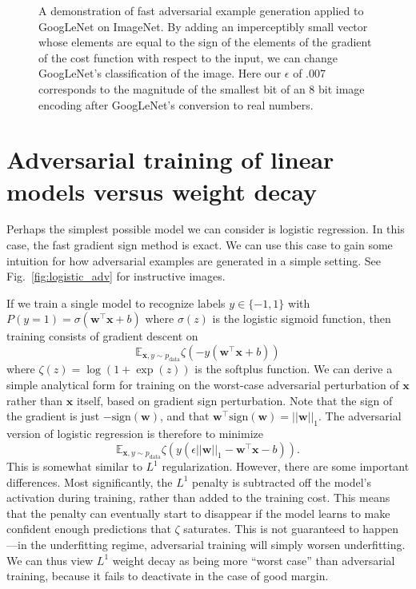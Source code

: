 \documentclass{article} %
\def\eps{{\epsilon}}
\def\sign{{\text{sign}}}
\def\vw{{\bm{w}}}
\def\vx{{\bm{x}}}
\begin{document}
\begin{figure}[t]
\begin{tabular}{>{\centering\arraybackslash}m{}m{.5in}>{\centering\arraybackslash}m{}m{.1in}>{\centering\arraybackslash}m{}}
\end{tabular}
    \caption[Fast adversarial sample generation]{
    A demonstration of fast adversarial example generation applied to GoogLeNet
    \citep{Szegedy-et-al-arxiv2014}
    on ImageNet.
    By adding an imperceptibly small vector whose elements are equal to the sign of the elements
    of the gradient of the cost function with respect to the input, we can
    change GoogLeNet's classification of the image. Here our $\eps$ of .007
    corresponds to the magnitude of the smallest bit of an 8 bit image encoding
    after GoogLeNet's conversion to real numbers.
    }
\label{panda}
\end{figure}

\section{Adversarial training of linear models versus weight decay}

Perhaps the simplest possible model we can consider is logistic regression. In this case, the fast
gradient sign method is exact. We can use this case to gain some intuition for how adversarial examples
are generated in a simple setting. See Fig.~\ref{fig:logistic_adv} for instructive images.

If we train a single model
to recognize labels $y \in \{ -1, 1\}$ with $P(y=1) = \sigma\left( \vw^\top \vx + b\right)$ where $\sigma(z)$
is the logistic sigmoid function, then training consists of gradient descent on
\[
    \mathbb{E}_{\vx, y \sim p_\text{data}} \zeta( -y (\vw^\top \vx + b))
\]
where $\zeta(z) = \log \left(1 + \exp(z) \right)$ is the softplus function.
We can derive a simple analytical form for training on the worst-case adversarial perturbation of
$\vx$ rather than $\vx$ itself, based on gradient sign perturbation.
Note that the sign of the gradient is just $- \sign(\vw)$, and that $\vw^\top \sign(\vw) = ||\vw||_1$.
The adversarial version of
logistic regression is therefore to minimize
\[
    \mathbb{E}_{\vx, y \sim p_\text{data}} \zeta( y (\eps ||\vw||_1 - \vw^\top \vx - b)).
\]
This is somewhat similar to $L^1$ regularization. However, there are some important differences.
Most significantly, the $L^1$ penalty is subtracted off the model's activation during training, rather than
added to the training cost. This means that the penalty can eventually start to disappear if the model
learns to make confident enough predictions that $\zeta$ saturates. This is not guaranteed to happen---in
the underfitting regime, adversarial training will simply worsen underfitting.
We can thus view $L^1$ weight decay as being more ``worst case'' than adversarial training, because
it fails to deactivate in the case of good margin.
\end{document}
